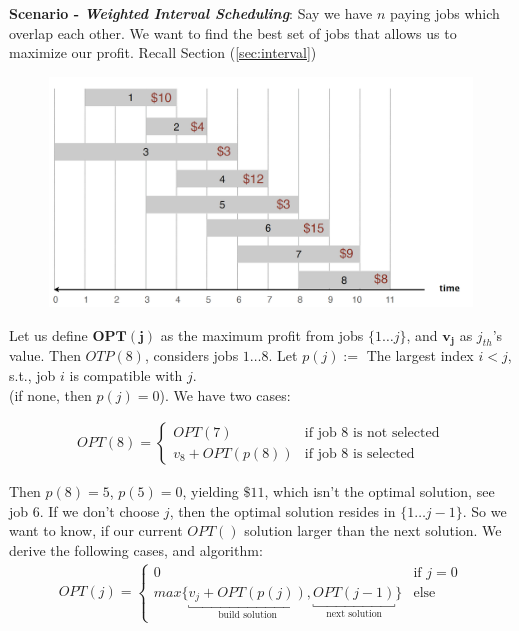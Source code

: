 \newpage
\label{sec:WIS}
\noindent
\textbf{Scenario - \textit{Weighted Interval Scheduling}}: Say we have $n$ paying jobs which overlap each other.
We want to find the best set of jobs that allows us to maximize our profit. Recall Section (\ref{sec:interval})

\begin{figure}[h]
\centering
\includegraphics[width=.7\textwidth]{Sections/dp/wis.png}
\end{figure}

\noindent
Let us define $\mathbf{OPT(j)}$ as the maximum profit from jobs $\{1\dots j\}$, and $\mathbf{v_j}$ as $j_{th}$'s value. Then $OTP(8)$, considers jobs $1\dots 8$. Let $p(j):=$ The largest index $i < j$, s.t., job $i$ is compatible with $j$.\\
(if none, then $p(j) = 0$). We have two cases:

\vspace{-1em}
\begin{align*}
    OPT(8) =
    \begin{cases}
        OPT(7) & \text{if job 8 is not selected}\\
        v_8 + OPT(p(8)) & \text{if job 8 is selected}
    \end{cases}
\end{align*}

\noindent
Then $p(8)=5$, $p(5)=0$, yielding $\$11$, which isn't the optimal solution, see job 6.
If we don't choose $j$, then the optimal solution resides in $\{1\dots j-1\}$. So we want to know,
if our current $OPT()$ solution larger than the next solution. We derive the following cases, and algorithm:
\begin{align*}
    OPT(j) =
    \begin{cases}
        0 & \text{if $j=0$}\\
        max\{\underbracket{v_j+OPT(p(j))}_{\text{build solution}}, \underbracket{OPT(j-1)}_{\text{next solution}}\} & \text{else}
    \end{cases}
\end{align*}

